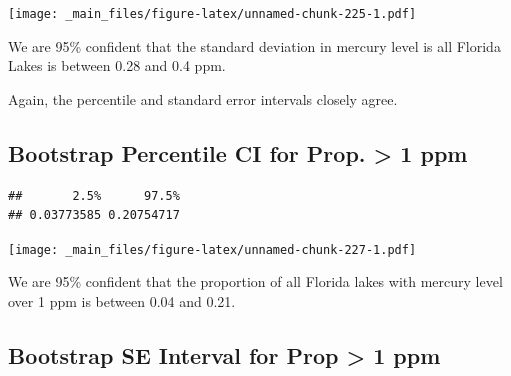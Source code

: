 \documentclass[]{book}
\newenvironment{Shaded}{\begin{snugshade}}{\end{snugshade}}
\newcommand{\KeywordTok}[1]{\textcolor[rgb]{0.13,0.29,0.53}{\textbf{#1}}}
\newcommand{\DecValTok}[1]{\textcolor[rgb]{0.00,0.00,0.81}{#1}}
\newcommand{\FloatTok}[1]{\textcolor[rgb]{0.00,0.00,0.81}{#1}}
\newcommand{\StringTok}[1]{\textcolor[rgb]{0.31,0.60,0.02}{#1}}
\newcommand{\OperatorTok}[1]{\textcolor[rgb]{0.81,0.36,0.00}{\textbf{#1}}}
\newcommand{\NormalTok}[1]{#1}
\begin{document}
\texttt{[image: \_main\_files/figure-latex/unnamed-chunk-225-1.pdf]}

We are 95\% confident that the standard deviation in mercury level is
all Florida Lakes is between 0.28 and 0.4 ppm.

Again, the percentile and standard error intervals closely agree.

\subsection{Bootstrap Percentile CI for Prop. \textgreater{} 1
ppm}\label{bootstrap-percentile-ci-for-prop.-1-ppm}

\begin{Shaded}
\end{Shaded}

\begin{verbatim}
##       2.5%      97.5% 
## 0.03773585 0.20754717
\end{verbatim}

\texttt{[image: \_main\_files/figure-latex/unnamed-chunk-227-1.pdf]}

We are 95\% confident that the proportion of all Florida lakes with
mercury level over 1 ppm is between 0.04 and 0.21.

\subsection{Bootstrap SE Interval for Prop \textgreater{} 1
ppm}\label{bootstrap-se-interval-for-prop-1-ppm}

\begin{Shaded}
\end{Shaded}
\end{document}
